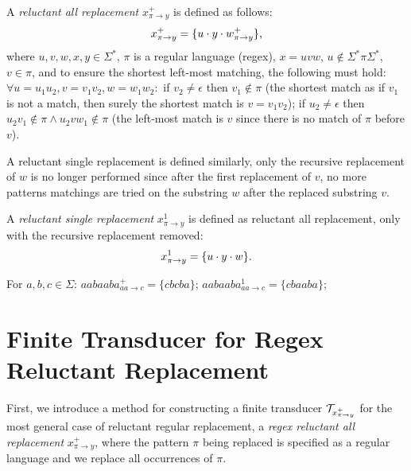 
\begin{definition} \hfill \newline
  A \emph{reluctant all replacement} $x^{+}_{\pi \rightarrow y}$ is defined as follows: \newline
  $$x^{+}_{\pi \rightarrow y} = \{ u \cdot y \cdot w^{+}_{\pi \rightarrow y} \} \text{,}$$
  where $u, v, w, x, y \in \Sigma^*$, $\pi$ is a regular language (regex), $x = u v w$, $u \notin \Sigma^* \pi \Sigma^*$, $v \in \pi$, and to ensure the shortest left-most matching, the following must hold: $\forall u = u_1 u_2, v = v_1 v_2, w = w_1 w_2:$ if $v_2 \neq \epsilon$ then $v_1 \notin \pi$ (the shortest match as if $v_1$ is not a match, then surely the  shortest match is $v = v_1v_2$); if $u_2 \neq \epsilon$ then $u_2 v_1 \notin \pi \land u_2 v w_1 \notin \pi$ (the left-most match is $v$ since there is no match of $\pi$ before $v$).
\end{definition}

A reluctant single replacement is defined similarly, only the recursive replacement of $w$ is no longer performed since after the first replacement of $v$, no more patterns matchings are tried on the substring $w$ after the replaced substring $v$.
\begin{definition} \hfill \newline
  A \emph{reluctant single replacement} $x^{1}_{\pi \rightarrow y}$ is defined as reluctant all replacement, only with the recursive replacement removed:
  $$x^{1}_{\pi \rightarrow y} = \{ u \cdot y \cdot w \} \text{.}$$
\end{definition}

\begin{example}
  For $a, b, c \in \Sigma$: $aabaaba^{+}_{aa \rightarrow c} = \{ cbcba \}$; $aabaaba^{1}_{aa \rightarrow c} = \{ cbaaba \}$;
\end{example}

\section{Finite Transducer for Regex Reluctant Replacement}

First, we introduce a method for constructing a finite transducer $\mathcal{T}_{x^{+}_{\pi \rightarrow y}}$ for the most general case of reluctant regular replacement, a \emph{regex reluctant all replacement} $x^{+}_{\pi \rightarrow y}$, where the pattern $\pi$ being replaced is specified as a regular language and we replace all occurrences of $\pi$.

